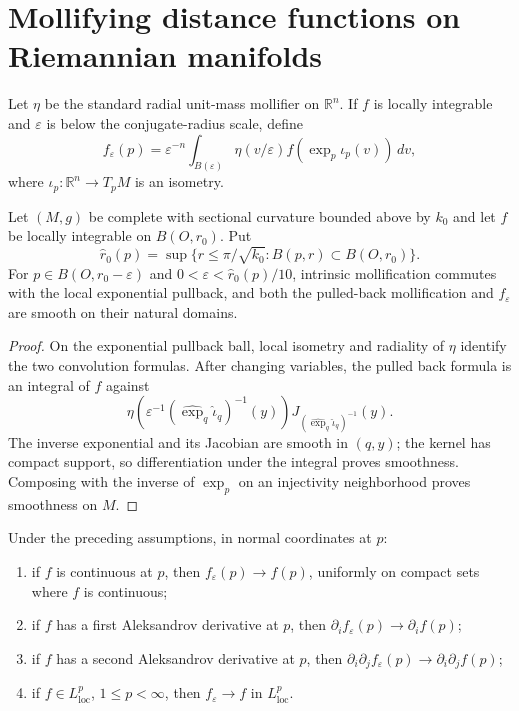 \section{Mollifying distance functions on Riemannian manifolds}

Let $\eta$ be the standard radial unit-mass mollifier on $\mathbb R^n$.  If
$f$ is locally integrable and $\varepsilon$ is below the conjugate-radius
scale, define
\[
f_\varepsilon(p)=\varepsilon^{-n}\int_{B(\varepsilon)}
\eta(v/\varepsilon)f(\exp_p\iota_p(v))\,dv,
\]
where $\iota_p:\mathbb R^n\to T_pM$ is an isometry.

\begin{lemma}
\label{lem:intrinsic-mollification-smooth}
Let $(M,g)$ be complete with sectional curvature bounded above by $k_0$ and
let $f$ be locally integrable on $B(O,r_0)$.  Put
\[
\widehat r_0(p)=\sup\{r\leq\pi/\sqrt{k_0}:B(p,r)\subset B(O,r_0)\}.
\]
For $p\in B(O,r_0-\varepsilon)$ and
$0<\varepsilon<\widehat r_0(p)/10$, intrinsic mollification commutes with the
local exponential pullback, and both the pulled-back mollification and
$f_\varepsilon$ are smooth on their natural domains.
\end{lemma}

\begin{proof}
\sketch
{}
On the exponential pullback ball, local isometry and radiality of $\eta$
identify the two convolution formulas.  After changing variables, the pulled
back formula is an integral of $f$ against
\[
\eta\!\left(\varepsilon^{-1}(\widehat{\exp}_q\widehat{\iota}_q)^{-1}(y)\right)
 J_{(\widehat{\exp}_q\widehat{\iota}_q)^{-1}}(y).
\]
The inverse exponential and its Jacobian are smooth in $(q,y)$; the kernel
has compact support, so differentiation under the integral proves smoothness.
Composing with the inverse of $\exp_p$ on an injectivity neighborhood proves
smoothness on $M$.
\end{proof}

\begin{lemma}
\label{lem:intrinsic-mollifier-derivative-convergence}
Under the preceding assumptions, in normal coordinates at $p$:
\begin{enumerate}
\item if $f$ is continuous at $p$, then $f_\varepsilon(p)\to f(p)$, uniformly
on compact sets where $f$ is continuous;
\item if $f$ has a first Aleksandrov derivative at $p$, then
$\partial_if_\varepsilon(p)\to\partial_if(p)$;
\item if $f$ has a second Aleksandrov derivative at $p$, then
$\partial_i\partial_jf_\varepsilon(p)\to\partial_i\partial_jf(p)$;
\item if $f\in L^p_{\mathrm{loc}}$, $1\leq p<\infty$, then
$f_\varepsilon\to f$ in $L^p_{\mathrm{loc}}$.
\end{enumerate}
\end{lemma}

